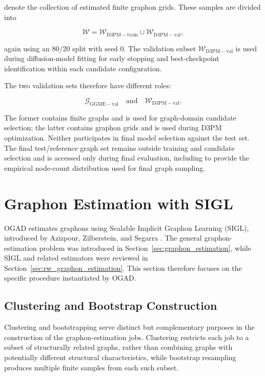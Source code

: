 denote the collection of estimated finite graphon grids. These samples are divided into

\[
\mathcal{W}
=
\mathcal{W}_{\mathrm{D3PM-train}}
\cup
\mathcal{W}_{\mathrm{D3PM-val}},
\]

again using an 80/20 split with seed \(0\). The validation subset
\(\mathcal{W}_{\mathrm{D3PM-val}}\) is used during diffusion-model fitting for early stopping and best-checkpoint identification within each candidate configuration.

The two validation sets therefore have different roles:

\[
\mathcal{G}_{\mathrm{GGME-val}}
\quad\text{and}\quad
\mathcal{W}_{\mathrm{D3PM-val}}.
\]

The former contains finite graphs and is used for graph-domain candidate selection; the latter contains graphon grids and is used during D3PM optimization. Neither participates in final model selection against the test set. The final test/reference graph set remains outside training and candidate selection and is accessed only during final evaluation, including to provide the empirical node-count distribution used for final graph sampling.


\section{Graphon Estimation with SIGL}
\label{sec:method_sigl}

OGAD estimates graphons using Scalable Implicit Graphon Learning (SIGL), introduced by Azizpour, Zilberstein, and Segarra \cite{azizpour2025scalable}. The general graphon-estimation problem was introduced in Section~\ref{sec:graphon_estimation}, while SIGL and related estimators were reviewed in Section~\ref{sec:rw_graphon_estimation}. This section therefore focuses on the specific procedure instantiated by OGAD.

\subsection{Clustering and Bootstrap Construction}
\label{subsec:method_sigl_clustering}

Clustering and bootstrapping serve distinct but complementary purposes in the construction of the graphon-estimation jobs. Clustering restricts each job to a subset of structurally related graphs, rather than combining graphs with potentially different structural characteristics, while bootstrap resampling produces multiple finite samples from each such subset.

